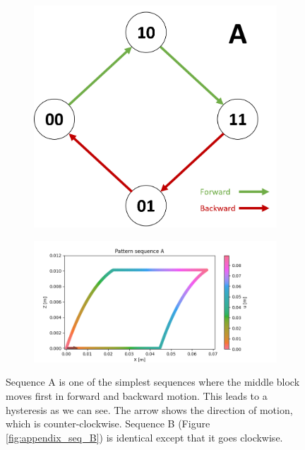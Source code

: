         \begin{figure}[h]
            \centering
            \begin{subfigure}{.2\textwidth}
            \includegraphics[width=\textwidth]{images/S_A.png}
            \end{subfigure}%
            \begin{subfigure}{.6\textwidth}
            \includegraphics[width=\textwidth]{images/A.png}
            \end{subfigure}
            \caption{Sequence A is one of the simplest sequences where the middle block moves first in forward and backward motion. This leads to a hysteresis as we can see. The arrow shows the direction of motion, which is counter-clockwise. Sequence B (Figure \ref{fig:appendix_seq_B}) is identical except that it goes clockwise.}
        \end{figure}
        

